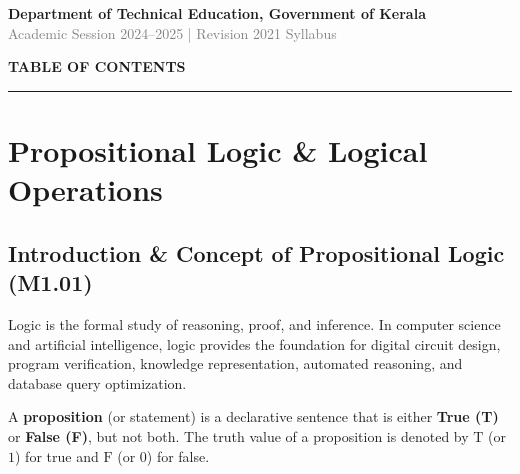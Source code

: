 \documentclass[11pt,a4paper]{article}
\begin{document}
\vfill

\begin{center}
    \small \textcolor{darkslate}{\textbf{Department of Technical Education, Government of Kerala}}\\
    \small \textcolor{gray}{Academic Session 2024--2025 | Revision 2021 Syllabus}
\end{center}

\clearpage %

\pagestyle{fancy}
\thispagestyle{fancy}

\begin{center}
    {\Large \textbf{\textcolor{primaryblue}{TABLE OF CONTENTS}}}\\[4pt]
    \rule{\linewidth}{1pt}
\end{center}

\vspace{10pt}
\tableofcontents

\clearpage %


\section{Propositional Logic \& Logical Operations}

\subsection{Introduction \& Concept of Propositional Logic (M1.01)}

Logic is the formal study of reasoning, proof, and inference. In computer science and artificial intelligence, logic provides the foundation for digital circuit design, program verification, knowledge representation, automated reasoning, and database query optimization.

\begin{definition}
A \textbf{proposition} (or statement) is a declarative sentence that is either \textbf{True (T)} or \textbf{False (F)}, but not both. The truth value of a proposition is denoted by $\text{T}$ (or $1$) for true and $\text{F}$ (or $0$) for false.
\end{definition}
\end{document}
